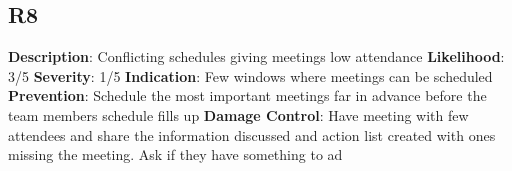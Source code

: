 \documentclass{article}
\begin{document}
\subsection{R8}
\textbf{Description}: Conflicting schedules giving meetings low attendance \newline
\textbf{Likelihood}: 3/5\newline
\textbf{Severity}: 1/5\newline
\textbf{Indication}: Few windows where meetings can be scheduled \newline
\textbf{Prevention}: Schedule the most important meetings far in advance before the team members schedule fills up \newline
\textbf{Damage Control}: Have meeting with few attendees and share the information discussed and action list created with ones missing the meeting. Ask if they have something to ad \newline
\end{document}
